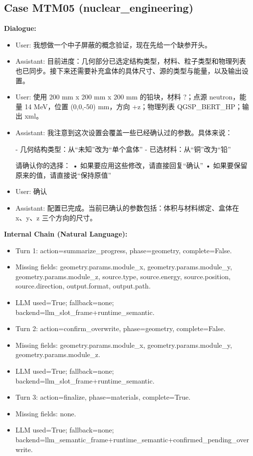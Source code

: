 \documentclass[11pt]{ctexart}
\begin{document}
\subsection{Case MTM05 (nuclear\_engineering)}
\textbf{Dialogue:}
\begin{itemize}
\item User: 我想做一个中子屏蔽的概念验证，现在先给一个缺参开头。
\item Assistant: 目前进度：几何部分已选定结构类型，材料、粒子类型和物理列表也已同步。接下来还需要补充盒体的具体尺寸、源的类型与能量，以及输出设置。
\item User: 使用 200 mm x 200 mm x 200 mm 的铅块，材料 ?；点源 neutron，能量 14 MeV，位置 (0,0,-50) mm，方向 +z；物理列表 QGSP\_BERT\_HP；输出 xml。
\item Assistant: 我注意到这次设置会覆盖一些已经确认过的参数。具体来说：

- 几何结构类型：从“未知”改为“单个盒体”
- 已选材料：从“铜”改为“铅”

请确认你的选择：
• 如果要应用这些修改，请直接回复“确认”
• 如果要保留原来的值，请直接说“保持原值”
\item User: 确认
\item Assistant: 配置已完成。当前已确认的参数包括：体积与材料绑定、盒体在 x、y、z 三个方向的尺寸。
\end{itemize}
\textbf{Internal Chain (Natural Language):}
\begin{itemize}
\item Turn 1: action=summarize\_progress, phase=geometry, complete=False.
\item Missing fields: geometry.params.module\_x, geometry.params.module\_y, geometry.params.module\_z, source.type, source.energy, source.position, source.direction, output.format, output.path.
\item LLM used=True; fallback=none; backend=llm\_slot\_frame+runtime\_semantic.
\item Turn 2: action=confirm\_overwrite, phase=geometry, complete=False.
\item Missing fields: geometry.params.module\_x, geometry.params.module\_y, geometry.params.module\_z.
\item LLM used=True; fallback=none; backend=llm\_slot\_frame+runtime\_semantic.
\item Turn 3: action=finalize, phase=materials, complete=True.
\item Missing fields: none.
\item LLM used=True; fallback=none; backend=llm\_semantic\_frame+runtime\_semantic+confirmed\_pending\_overwrite.
\end{itemize}
\end{document}
